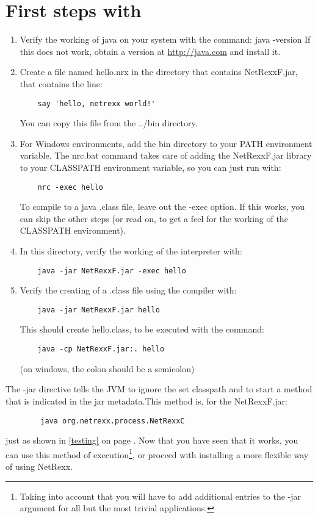 \section{First steps with \nr{}}
\begin{enumerate}
\item Verify the working of java on your system with the command:
	java -version\newline
If this does not work, obtain a version at \url{http://java.com} and install it.

\item Create a file named hello.nrx in the directory that contains
  NetRexxF.jar, that contains  the line:
\begin{verbatim}
	say 'hello, netrexx world!'
\end{verbatim}
You can copy this file from the ../bin directory.
\item For Windows environments, add the bin directory to your PATH
  environment variable. The nrc.bat command takes care of adding the
  NetRexxF.jar library to your CLASSPATH environment variable,  so you
  can just run with:
\begin{verbatim}
	nrc -exec hello
\end{verbatim}
To compile to a java .class file, leave out the -exec option. If this
works, you can skip the other steps (or read on, to get a feel for the
working of the CLASSPATH environment).
\item In this directory, verify the working of the interpreter with:
\begin{verbatim}
	java -jar NetRexxF.jar -exec hello
\end{verbatim}
\item Verify the creating of a .class file using the compiler with:
\begin{verbatim}
	java -jar NetRexxF.jar hello
\end{verbatim}
This should create hello.class, to be executed with the command:
\begin{verbatim}
	java -cp NetRexxF.jar:. hello
\end{verbatim}
(on windows, the colon should be a semicolon)
\end{enumerate}
The -jar directive tells the JVM to ignore the set classpath and to
start a method that is indicated in the jar metadata.This method is,
for the NetRexxF.jar: 
 \begin{verbatim}
        java org.netrexx.process.NetRexxC
\end{verbatim}
just as shown in \ref{testing} on page \pageref{testing}. Now that you
have seen that it works, you can use this method of
execution\footnote{Taking into account that you will have to add
  additional entries to the -jar argument for all but the most trivial
applications.}, or
proceed with installing a more flexible way of using NetRexx.

